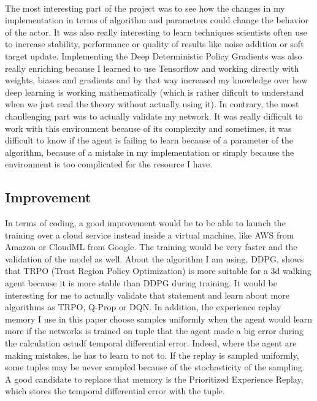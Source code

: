 \documentclass{article}
\begin{document}
\paragraph{}
The most interesting part of the project was to see how the changes in my implementation in terms
of algorithm and parameters could change the behavior of the actor. It was also really interesting
to learn techniques scientists often use to increase stability, performance or quality of results
like noise addition or soft target update. Implementing the Deep Deterministic Policy Gradients
was also really enriching because I learned to use Tensorflow and working directly with weights,
biases and gradients and by that way increased my knowledge over how deep learning is working
mathematically (which is rather dificult to understand when we just read the theory without
actually using it). In contrary, the most chanllenging part was to actually
validate my network. It was really difficult to work with this environment
because of its complexity and sometimes, it was difficult to know if the agent
is failing to learn because of a parameter of the algorithm, because of a
mistake in my implementation or simply because the environment is too
complicated for the resource I have. 

\subsection{Improvement}

In terms of coding, a good improvement would be to be able to launch the
training over a cloud service instead inside a virtual machine, like AWS from
Amazon or CloudML from Google. The training would be very faster and the
validation of the model as well. About the algorithm I am using, DDPG,
\citeauthor{GuLilGhaTurLev17} shows that TRPO (Trust Region Policy Optimization)
is more suitable for a 3d walking agent because it is more stable than DDPG during training. It would be
interesting for me to actually validate that statement and learn about more
algorithms as TRPO, Q-Prop or DQN. In addition, the experience replay memory I
use in this paper choose samples uniformly when the agent would learn more if
the networks is trained on tuple that the agent made a big error during the
calculation ostudf temporal differential error. Indeed, where the agent are making
mistakes, he has to learn to not to. If the replay is sampled uniformly, some
tuples may be never sampled because of the stochasticity of the sampling. A good
candidate to replace that memory is the Prioritized Experience
Replay\cite{Schaul2015PrioritizedER}, which stores the temporal differential
error with the tuple.



\end{document}
